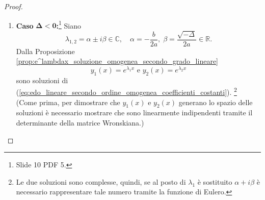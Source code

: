 \begin{proof}
\begin{enumerate}
\begin{equation*}
\begin{matrix}
				a(\lambda^2e^{\lambda x} u(x) + \lambda e ^{\lambda x}u'(x)) + b(\lambda e^{\lambda x}u(x) + e^{\lambda x}u'(x)) + ce^{\lambda x}u(x) &=&\\\\
				\underbrace{e^{\lambda x}}_{>0} [\underbrace{(a\lambda^2+b\lambda +c) u(x)}_{0} + a u''(x)+(2a\lambda + b)u'(x)] &=& a u''(x)+(2a\lambda + b)u'(x) &=& 0.
			\end{matrix}
		\end{equation*}
		Dividendo per $a$ è ottenuto (il caso (\ref{eq:lambda1_+_lambda2}), ovvero)
		\begin{equation*}
			u''(x)+\left(2\lambda + \frac{b}{a}\right)u'(x)=0.
		\end{equation*}
		dove $2\lambda = -\frac{b}{a}$ e $u''(x)=0$.
		Pertanto, ponendo $u(x)'=v(x)$, è ottenuto $v'(x)=0,\,v(x)=u'(x)=c,\,\forall x\in\mathbb{I}$. Quindi, integrando
		\begin{equation*}
			u(x) = \int u'(x)\,dx = \int c\, dx =  c_1+c_2 x,
		\end{equation*}
		e dunque, sostituendo ($u(x)$ in (\ref{eq:integrale_generale_delta_=_0}))
		\begin{equation*}
			z(x) = e^{\lambda x}u(x) = e^{\lambda x} (c_1+c_2x) = c_1\cdot \underbrace{e^{\lambda x}}_{(x)} + c_2\cdot\underbrace{x\cdot e^{\lambda x}}_{y_2(x)}.
		\end{equation*}
		(Quindi, vale la tesi anche nel caso 2, dato che in corrispondenza di $\Delta=0$ sono considerate $y_1=e^{\lambda x}$ e $y_2=x\cdot e^{\lambda x}$ ed una soluzione qualsiasi $z(x)$ è una combinazione di $y_1$ e $y_2$)
		\item \textbf{Caso} $\boldsymbol{\Delta<0}$\textbf{:}\footnote{Slide 10 PDF 5.} Siano
		\begin{equation*}
			\lambda_{1,2}=\alpha\pm i\beta\in\mathbb{C},\quad \alpha=-\frac{b}{2a},\;\beta = \frac{\sqrt{-\Delta}}{2a}\in\mathbb{R}.
		\end{equation*}
		Dalla Proposizione \ref{prop:e^lambdax_soluzione_omogenea_secondo_grado_lineare}
		\begin{equation*}
			y_1(x) = e^{\lambda_1 x} \text{ e } y_2(x)=e^{\lambda_2 x}
		\end{equation*}
		sono soluzioni di (\ref{eq:edo_lineare_secondo_ordine_omogenea_coefficienti_costanti}). \footnote{Le due soluzioni sono complesse, quindi, se al posto di $\lambda_1$ è sostituito $\alpha + i\beta$ è necessario rappresentare tale numero tramite la funzione di Eulero.}\\
		(Come prima, per dimostrare che $y_1(x) \text{ e } y_2(x)$ generano lo spazio delle soluzioni è necessario mostrare che sono linearmente indipendenti tramite il determinante della matrice Wronskiana.)
		

\end{enumerate}
\end{proof}
